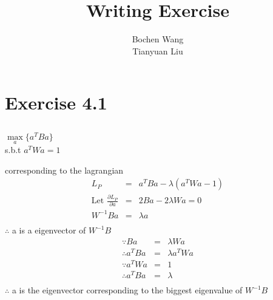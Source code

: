 \documentclass[a4paper]{article}
\begin{document}
\title{Writing Exercise}
\author{Bochen Wang\\Tianyuan Liu}
\maketitle
\section{Exercise 4.1}
\subsection{}
\begin{center}
$\underset{a}{\max } \{a^TBa \}$\\
s.b.t $a^TWa = 1$ \\	
\end{center}
corresponding to the lagrangian \\	
\begin{eqnarray*}
	L_P &=& a^TBa - \lambda(a^TWa-1)\\
	\text{Let }\frac{\partial{L_P}}{\partial{a}} &=& 2Ba-2\lambda Wa = 0\\
	W^{-1}Ba &=& \lambda a\\
\end{eqnarray*}
$\therefore$ a is a eigenvector of $W^{-1}B$\\
\begin{eqnarray*}
	\because Ba &=& \lambda Wa \\
	\therefore a^TBa &=& \lambda a^TWa \\
	\because a^TWa &=& 1 \\
	\therefore a^TBa &=& \lambda \\		
\end{eqnarray*}
$\therefore$ a is the eigenvector corresponding to the biggest eigenvalue of $W^{-1}B$\\
\end{document}
